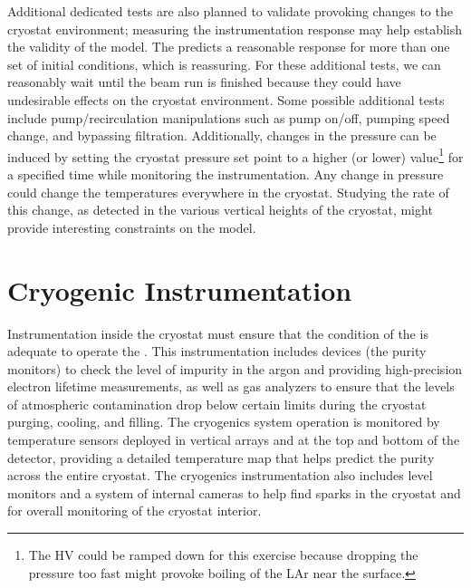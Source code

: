 Additional dedicated tests are also planned to validate  provoking changes to the cryostat environment; measuring the instrumentation response may help establish the validity of the  model. The  predicts a reasonable response for more than one set of initial conditions, which is reassuring. For these additional tests, we can reasonably wait until the beam run is finished because they  could have undesirable effects on the cryostat environment. Some possible additional tests include pump/recirculation manipulations such as pump on/off, pumping speed change, and bypassing filtration. Additionally, changes in the pressure can be induced by setting the cryostat pressure set point to a higher (or lower) value\footnote{The HV could be ramped down for this exercise because dropping the pressure too fast might provoke boiling of the LAr near the
surface.}  for a specified time while monitoring the instrumentation. Any change in pressure could change the temperatures everywhere in the cryostat. Studying the rate of this change, as
detected in the various vertical heights of the cryostat, might provide interesting constraints on the  model. 


\section{Cryogenic Instrumentation}
\label{sec:fdgen-cryo-instr}
Instrumentation inside the cryostat must ensure that the condition of the  is adequate to operate the .
This instrumentation includes devices (the purity monitors) to check the level of impurity in the argon and providing high-precision electron lifetime measurements,
as well as gas analyzers to ensure that the levels of atmospheric contamination drop below certain limits during the cryostat purging, cooling, and filling.
The cryogenics system operation is monitored by temperature sensors deployed in vertical arrays and at the top and bottom of the detector, providing a 
detailed \threed temperature map that helps predict the  purity across the entire cryostat. The cryogenics instrumentation also includes \lar level monitors and
a system of internal cameras to help find sparks in the cryostat and for overall monitoring of the cryostat interior. 

